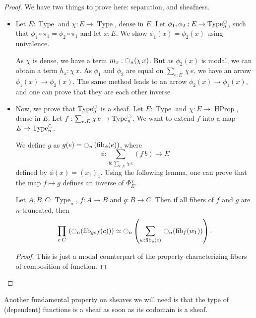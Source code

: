 \documentclass[notfinal]{jfrarticle}
\DeclareMathOperator{\Type}{Type}
\DeclareMathOperator{\HProp}{HProp}
\newcommand{\modal}{\ensuremath{\ocircle}}
\newcommand \fib[2] {\mathrm{fib}_{#1}(#2)}
\newcommand{\sumD}[3]{\sum_{#1:#2}\, #3}
\newcommand{\prodD}[3]{\prod_{#1:#2}\, #3}
\newcommand{\code}[1]{\texttt{#1}}
\begin{document}
\begin{proof}
  We have two things to prove here: separation, and sheafness.
  \begin{itemize}
  \item Let $E:\Type$ and $\chi:E\to\Type$, dense in $E$. 
    Let $\phi_1,\phi_2:E \to
    \Type_n^\modal$, such that $\phi_1 \circ \pi_1 = \phi_2 \circ
    \pi_1$ and let $x:E$. We show $\phi_1(x) = \phi_2(x)$ using
    univalence.
    
    As $\chi$ is dense, we have a term $m_x : \modal_n(\chi\, x)$.
    But as $\phi_2(x)$ is modal, we can obtain a term $h_x : \chi\,
    x$. 
    As $\phi_1$ and $\phi_2$ are equal on $\sumD e E {\chi\, e}$, we
    have an arrow $\phi_1(x) \to \phi_2(x)$.
    The same method leads to an arrow $\phi_2 (x) \to \phi_1 (x)$, and
    one can
    prove that they are each other inverse.
  \item Now, we prove that $\Type_n^\modal$ is a sheaf. Let $E:\Type$ and
  $\chi:E \to \HProp$, dense in $E$. Let $f:\sum_{e:E} \chi\, e \to
  \Type_n^\modal$. We want to extend $f$ into a map $E \to \Type_n^\modal$.

  We define $g$ as $g(e) = \modal_n \left( \fib \phi {e} \right)$,
  where
  \[ \phi : \sum_{b:\sumD e E {\chi\, e}} (f\,
    b) \to E\]
  defined by $\phi(x) = (x_1)_1$.
  Using the following lemma, one can prove that the map $f\mapsto g$
  defines an inverse of $\Phi_E^\chi$.
  \begin{lem}[\thethm\ (\code{nj\_fibers\_compose})]
    Let $A,B,C:\Type_n$, $f:A\to B$ and $g:B\to C$.
    Then
    if all fibers of $f$ and $g$ are $n$-truncated, then
      \[\prodD c C {\left( \modal_n(\fib {g \circ f} c) \right) \simeq
      \modal_n \left(  
        \sumD w {\fib g c} {\modal_n (\fib f {w_1})}
      \right)}.\]
  \end{lem}
  \begin{proof}
    This is just a modal counterpart of the property characterizing
    fibers of composition of function.
  \end{proof}
  \end{itemize}
\end{proof}

Another fundamental property on sheaves we will need is that the type of (dependent)
functions is a sheaf as soon as its codomain is a sheaf.
\end{document}
